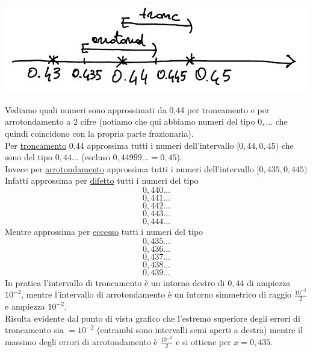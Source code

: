 \begin{center}
    \includegraphics[scale=0.65]{foto/img1}
\end{center}
Vediamo quali numeri sono approssimati da 0,44 per troncamento e per arrotondamento a 2 cifre (notiamo che qui abbiamo numeri del tipo $0,\dotsc$ che quindi coincidono con la propria parte frazionaria).\\
Per \uline{troncamento} 0,44 approssima tutti i numeri dell'intervallo $[0,44 , 0,45)$ che sono del tipo $0,44\dotsc$ (escluso $0,44\overline{999}\dotsc = 0,45$).\\
Invece per \uline{arrotondamento} approssima tutti i numeri dell'intervallo $[0,435 , 0,445)$ \\ 
Infatti approssima per \uline{difetto} tutti i numeri del tipo \[ 0,440\dotsc \] \[ 0,441\dotsc \] \[ 0,442\dotsc \] \[ 0,443\dotsc \] \[ 0,444\dotsc \]
Mentre approssima per \uline{eccesso} tutti i numeri del tipo \[ 0,435\dotsc \] \[ 0,436\dotsc \] \[ 0,437\dotsc \] \[ 0,438\dotsc \] \[ 0,439\dotsc \]
In pratica l'intervallo di troncamento è un intorno destro di $0,44$ di ampiezza $10^{-2}$, mentre l'intervallo di arrotondamento è un intorno simmetrico di raggio $\frac{10^{-2}}{2}$ e ampiezza $10^{-2}$.\\
Risulta evidente dal punto di vista grafico che l'estremo superiore degli errori di troncamento sia $= 10^{-2}$ (entrambi sono intervalli semi aperti a destra) mentre il massimo degli errori di arrotondamento è $\frac{10^{-2}}{2}$ e si ottiene per $x = 0,435$.
\newpage